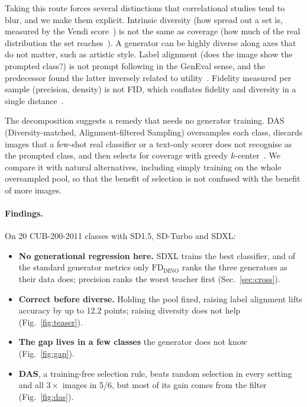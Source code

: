\documentclass[10pt,twocolumn,letterpaper]{article}
\newcommand{\FDD}{\text{FD}_{\text{DINO}}}
\begin{document}
Taking this route forces several distinctions that correlational studies tend to blur, and we make them explicit. Intrinsic diversity (how spread out a set is, measured by the Vendi score~\cite{friedman2023vendi}) is not the same as coverage (how much of the real distribution the set reaches~\cite{kynkaanniemi2019improved,naeem2020reliable}). A generator can be highly diverse along axes that do not matter, such as artistic style. Label alignment (does the image show the prompted class?) is not prompt following in the GenEval sense, and the predecessor found the latter inversely related to utility~\cite{adamkiewicz2026pretty}. Fidelity measured per sample (precision, density) is not FID, which conflates fidelity and diversity in a single distance~\cite{heusel2017gans,kynkaanniemi2023role}.

The decomposition suggests a remedy that needs no generator training. DAS (Diversity-matched, Alignment-filtered Sampling) oversamples each class, discards images that a few-shot real classifier or a text-only scorer does not recognise as the prompted class, and then selects for coverage with greedy $k$-center~\cite{gonzalez1985clustering,sener2018active}. We compare it with natural alternatives, including simply training on the whole oversampled pool, so that the benefit of selection is not confused with the benefit of more images.

\paragraph{Findings.} On 20 CUB-200-2011 classes with SD1.5, SD-Turbo and SDXL:
\begin{itemize}\setlength\itemsep{0pt}\setlength\topsep{2pt}
\item \textbf{No generational regression here.} SDXL trains the best classifier, and of the standard generator metrics only $\FDD$ ranks the three generators as their data does; precision ranks the worst teacher first (Sec.~\ref{sec:cross}).
\item \textbf{Correct before diverse.} Holding the pool fixed, raising label alignment lifts accuracy by up to 12.2 points; raising diversity does not help (Fig.~\ref{fig:teaser}).
\item \textbf{The gap lives in a few classes} the generator does not know (Fig.~\ref{fig:gap}).
\item \textbf{DAS}, a training-free selection rule, beats random selection in every setting and all $3\times$ images in 5/6, but most of its gain comes from the filter (Fig.~\ref{fig:das}).
\end{itemize}
\end{document}
